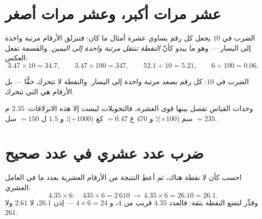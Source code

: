 \section{عشر مرات أكبر، وعشر مرات أصغر}

\begin{proposition}\label{prop:g5:decimalops:shift}
الضرب في $10$ يجعل كل رقم يساوي عشرة أمثال ما كان: فتنزلق
الأرقام مرتبة واحدة إلى اليسار --- وهو ما يبدو كأنّ \emph{النقطة
تنتقل مرتبة واحدة إلى اليمين}. والقسمة تفعل العكس:
\[
3.47 \times 10 = 34.7, \qquad
3.47 \times 100 = 347, \qquad
52.1 \div 10 = 5.21, \qquad
6 \div 100 = 0.06 .
\]
\end{proposition}
\admitted

\begin{omfigure}

{\small الضرب في $10$: كل رقم يصعد مرتبة واحدة إلى
اليسار. والنقطة لا تتحرك حقًّا --- بل الأرقام هي التي تتحرك.}
\end{omfigure}

\begin{example}\label{ex:g5:decimalops:convert}
وحدات القياس تفصل بينها قوى العشرة، فالتحويلات ليست إلا
هذه الانزلاقات: $2.35$ م $= 235$ سم ($\times 100$)؛ و $470$ غ
$= 0.47$ كغ ($\div 1000$)؛ و $1.5$ ل $= 150$ سل.
\end{example}

\section{ضرب عدد عشري في عدد صحيح}

\begin{method}\label{met:g5:decimalops:mult}
احسب كأن لا نقطة هناك، ثم أعطِ النتيجة من الأرقام العشرية
بعدد ما في العامل العشري:
\[
4.35 \times 6: \quad 435 \times 6 = 2\,610
\ \to\ 4.35 \times 6 = 26.10 = 26.1 .
\]
وقدِّر لتضع النقطة بثقة: فالعدد $4.35$ قريب من
$4$، و $4 \times 6 = 24$ --- إذن $26.1$، لا $2.61$ ولا $261$.
\end{method}

